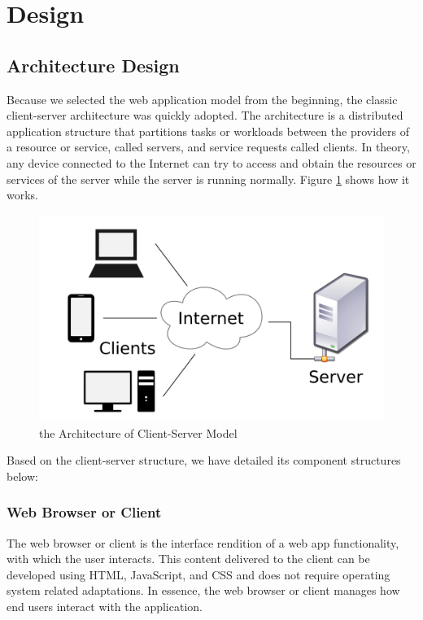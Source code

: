 \section{Design}
\label{sec:Design}

\subsection{Architecture Design}
\label{sec:Design>Architecture Design}
Because we selected the web application model from the beginning, the classic client-server architecture was quickly adopted. The architecture is a distributed application structure that partitions tasks or workloads between the providers of a resource or service, called servers, and service requests called clients. In theory, any device connected to the Internet can try to access and obtain the resources or services of the server while the server is running normally. Figure \ref{fig:Client-Server Architecture} shows how it works.

\begin{figure}[htb]
\centering
\includegraphics[width=\textwidth]{section03/assets/client_server.png}
\caption[the Architecture of Client-Server Model]{\label{fig:Client-Server Architecture}the Architecture of Client-Server Model}
\end{figure}

Based on the client-server structure, we have detailed its component structures below:
\subsubsection{Web Browser or Client}
\label{sec:Design>Architecture Design>Web Browser or Client}
The web browser or client is the interface rendition of a web app functionality, with which the user interacts. This content delivered to the client can be developed using HTML, JavaScript, and CSS and does not require operating system related adaptations. In essence, the web browser or client manages how end users interact with the application.

